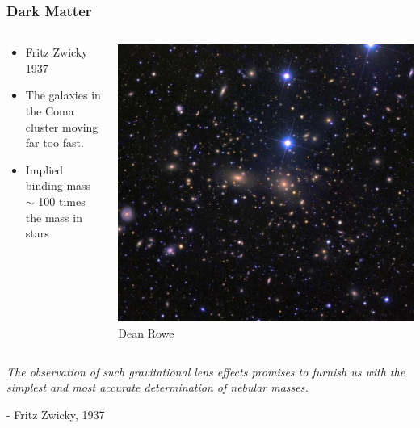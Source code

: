 \documentclass{beamer}
\begin{document}
\frame
{
    \frametitle{Dark Matter}

    \begin{columns}
        \begin{column}{0.5\textwidth}    
            \begin{itemize}

                \item Fritz Zwicky 1937

                \item The galaxies in the Coma cluster moving far too fast.

                \item Implied binding mass $\sim$ 100 times the mass in stars

            \end{itemize}
        \end{column}
        \begin{column}{0.5\textwidth}
            \begin{center}
                \includegraphics[width=\textwidth]{comacluster_rowe_big_crop.jpg}
                \newline
                {\tiny Dean Rowe}
            \end{center}
        \end{column}
    \end{columns}
}

\frame
{

    {\Large 
        {\em The observation of such gravitational lens effects promises to furnish us with
        the simplest and most accurate determination of nebular masses.}
        \newline

        \hfill - Fritz Zwicky, 1937
    }
}
\end{document}
